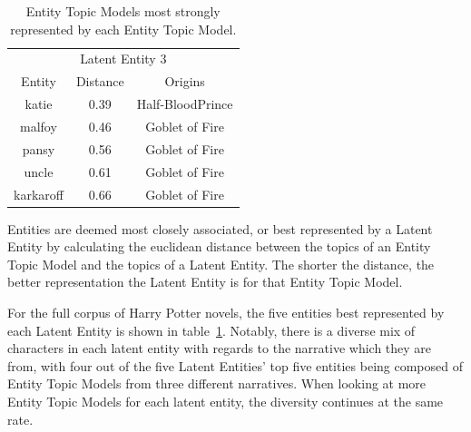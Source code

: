 \documentclass[10pt]{report}
\begin{document}
\begin{table}[h!]
{\begin{tabular}{c | c | c }
    \multicolumn{3}{c}{Latent Entity 3}\\
    Entity    & Distance & Origins\\
    \hline
    katie	    &0.39&	Half-BloodPrince\\
    malfoy	    &0.46&	Goblet of Fire  \\
    pansy	    &0.56&	Goblet of Fire  \\
    uncle	    &0.61&	Goblet of Fire  \\
    karkaroff       &0.66&	Goblet of Fire
  \end{tabular}}
  \caption{Entity Topic Models most strongly represented by each Entity Topic Model.\label{tab:hp_le_fulls}}
\end{table}
\renewcommand{\baselinestretch}{2.0}\normalsize
\renewcommand{\arraystretch}{1.0}

Entities are deemed most closely associated, or best represented by a Latent Entity by calculating the euclidean distance between the topics of an Entity Topic Model and the topics of a Latent Entity. The shorter the distance, the better representation the Latent Entity is for that Entity Topic Model.

For the full corpus of Harry Potter novels, the five entities best represented by each Latent Entity is shown in table~\ref{tab:hp_le_fulls}. Notably, there is a diverse mix of characters in each latent entity with regards to the narrative which they are from, with four out of the five Latent Entities' top five entities being composed of Entity Topic Models from three different narratives. When looking at more Entity Topic Models for each latent entity, the diversity continues at the same rate.
\end{document}
